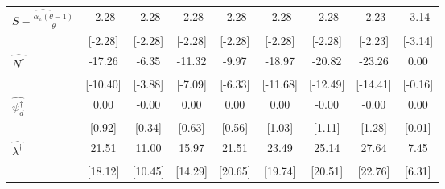 \documentclass[12pt,leqno]{article}
\begin{document}
\begin{table}[tbp]
\begin{tabular}{lSSSSSSSS}
$\widehat{S-\frac{\alpha_x(\theta-1)}{\theta}}$ & -2.28 & -2.28 & -2.28 & -2.28 & -2.28 & -2.28 & -2.23 & -3.14 \\ 
 & [-2.28] & [-2.28] & [-2.28] & [-2.28] & [-2.28] & [-2.28] & [-2.23] & [-3.14] \\ [1ex] 
$\widehat{N^\dagger}$ & -17.26 & -6.35 & -11.32 & -9.97 & -18.97 & -20.82 & -23.26 & 0.00 \\ 
 & [-10.40] & [-3.88] & [-7.09] & [-6.33] & [-11.68] & [-12.49] & [-14.41] & [-0.16] \\ [1ex] 
$\widehat{\psi_d^\dagger}$ & 0.00 & -0.00 & 0.00 & 0.00 & 0.00 & -0.00 & -0.00 & 0.00 \\ 
 & [0.92] & [0.34] & [0.63] & [0.56] & [1.03] & [1.11] & [1.28] & [0.01] \\ [1ex] 
$\widehat{\lambda^\dagger}$ & 21.51 & 11.00 & 15.97 & 21.51 & 23.49 & 25.14 & 27.64 & 7.45 \\ 
 & [18.12] & [10.45] & [14.29] & [20.65] & [19.74] & [20.51] & [22.76] & [6.31] \\ [1ex] 
\bottomrule
\end{tabular}
\end{table}
\end{document}
